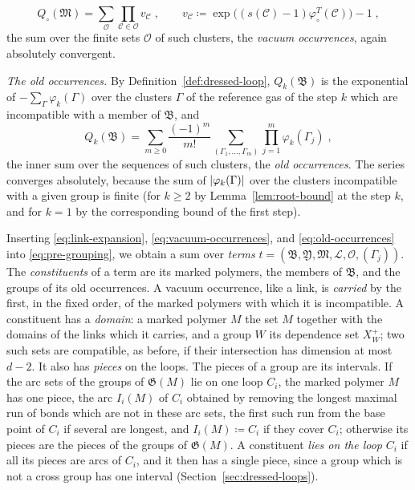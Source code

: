 \documentclass[11pt]{preprint}
\DeclarePairedDelimiter{\abs}{\lvert}{\rvert}
\numberwithin{equation}{section}
\theoremstyle{definition}
\theoremstyle{remark}
\theoremstyle{plain}
\begin{document}
\begin{equation}\label{eq:vacuum-occurrences}
    Q_\circ(\mathfrak M) = \sum_{\mathcal O}\prod_{\mathcal C \in \mathcal O}v_{\mathcal C}\;,
    \qquad
    v_{\mathcal C} \coloneqq \exp\bigl((s(\mathcal C) - 1)\varphi^T_\circ(\mathcal C)\bigr) - 1\;,
\end{equation}
the sum over the finite sets $\mathcal O$ of such clusters, the \emph{vacuum occurrences}, again absolutely convergent.

\emph{The old occurrences.} By Definition~\ref{def:dressed-loop}, $Q_k(\mathfrak B)$ is the exponential of $-\sum_\Gamma\varphi_k(\Gamma)$ over the clusters $\Gamma$ of the reference gas of the step $k$ which are incompatible with a member of $\mathfrak B$, and
\begin{equation}\label{eq:old-occurrences}
    Q_k(\mathfrak B) = \sum_{m \geq 0}\frac{(-1)^m}{m!}\sum_{(\Gamma_1, \dots, \Gamma_m)}\prod_{j=1}^{m}\varphi_k(\Gamma_j)\;,
\end{equation}
the inner sum over the sequences of such clusters, the \emph{old occurrences}. The series converges absolutely, because the sum of $\abs{\varphi_k(\Gamma)}$ over the clusters incompatible with a given group is finite (for $k \geq 2$ by Lemma~\ref{lem:root-bound} at the step $k$, and for $k = 1$ by the corresponding bound of the first step).

Inserting \eqref{eq:link-expansion}, \eqref{eq:vacuum-occurrences}, and \eqref{eq:old-occurrences} into \eqref{eq:pre-grouping}, we obtain a sum over \emph{terms} $t = (\mathfrak B, \mathfrak Y, \mathfrak M, \mathcal L, \mathcal O, (\Gamma_j))$. The \emph{constituents} of a term are its marked polymers, the members of $\mathfrak B$, and the groups of its old occurrences. A vacuum occurrence, like a link, is \emph{carried} by the first, in the fixed order, of the marked polymers with which it is incompatible. A constituent has a \emph{domain}: a marked polymer $M$ the set $M$ together with the domains of the links which it carries, and a group $W$ its dependence set $X^+_W$; two such sets are compatible, as before, if their intersection has dimension at most $d - 2$. It also has \emph{pieces} on the loops. The pieces of a group are its intervals. If the arc sets of the groups of $\mathfrak G(M)$ lie on one loop $C_i$, the marked polymer $M$ has one piece, the arc $I_i(M)$ of $C_i$ obtained by removing the longest maximal run of bonds which are not in these arc sets, the first such run from the base point of $C_i$ if several are longest, and $I_i(M) \coloneqq C_i$ if they cover $C_i$; otherwise its pieces are the pieces of the groups of $\mathfrak G(M)$. A constituent \emph{lies on the loop} $C_i$ if all its pieces are arcs of $C_i$, and it then has a single piece, since a group which is not a cross group has one interval (Section~\ref{sec:dressed-loops}).
\end{document}
